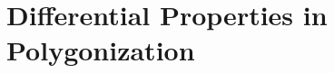 \documentclass[12pt, a4paper, oneside]{book}
\theoremstyle{plain}
\newtheorem{theorem}{Theorem}[chapter]
\theoremstyle{definition}
\newtheorem{definition}[theorem]{Definition}
\theoremstyle{remark}
\theoremstyle{definition}
\begin{document}
\section{Differential Properties in Polygonization}

\end{document}
